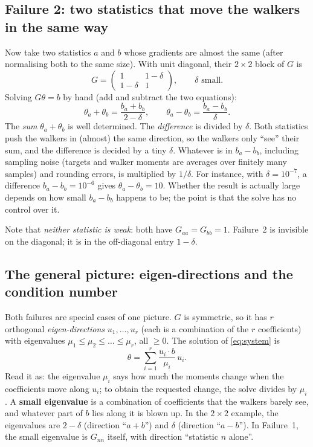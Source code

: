 \documentclass[11pt,a4paper]{article}
\begin{document}
\subsection{Failure 2: two statistics that move the walkers in the same way}\label{sec:fail2}
Now take two statistics $a$ and $b$ whose gradients are almost the same (after normalising both to
the same size). With unit diagonal, their $2\times2$ block of $G$ is
\[
  G=\begin{pmatrix}1&1-\delta\\ 1-\delta&1\end{pmatrix},\qquad \delta \text{ small}.
\]
Solving $G\theta=b$ by hand (add and subtract the two equations):
\[
  \theta_a+\theta_b=\frac{b_a+b_b}{2-\delta},\qquad
  \theta_a-\theta_b=\frac{b_a-b_b}{\delta}.
\]
The \emph{sum} $\theta_a+\theta_b$ is well determined. The \emph{difference} is divided by
$\delta$. Both statistics push the walkers in (almost) the same direction, so the walkers only
``see'' their sum, and the difference is decided by a tiny $\delta$. Whatever is in $b_a-b_b$,
including sampling noise (targets and walker moments are averages over finitely many samples) and
rounding errors, is multiplied by $1/\delta$. For instance, with $\delta=10^{-7}$, a difference
$b_a-b_b=10^{-6}$ gives $\theta_a-\theta_b=10$. Whether the result is actually large depends on
how small $b_a-b_b$ happens to be; the point is that the solve has no control over it.

Note that \emph{neither statistic is weak}: both have $G_{aa}=G_{bb}=1$. Failure~2 is invisible on
the diagonal; it is in the off-diagonal entry $1-\delta$.

\subsection{The general picture: eigen-directions and the condition number}
Both failures are special cases of one picture. $G$ is symmetric, so it has $r$ orthogonal
\emph{eigen-directions} $u_1,\dots,u_r$ (each is a combination of the $r$ coefficients) with
eigenvalues $\mu_1\le\mu_2\le\dots\le\mu_r$, all $\ge0$. The solution of \eqref{eq:system} is
\[
  \theta=\sum_{i=1}^r\frac{u_i\cdot b}{\mu_i}\,u_i .
\]
Read it as: the eigenvalue $\mu_i$ says how much the moments change when the coefficients move
along $u_i$; to obtain the requested change, the solve divides by $\mu_i$. A \textbf{small eigenvalue}
is a combination of coefficients that the walkers barely see, and whatever part of $b$ lies along it
is blown up. In the $2\times2$ example, the eigenvalues are $2-\delta$ (direction ``$a+b$'')
and $\delta$ (direction ``$a-b$''). In Failure~1, the small eigenvalue is $G_{nn}$ itself, with
direction ``statistic $n$ alone''.
\end{document}
